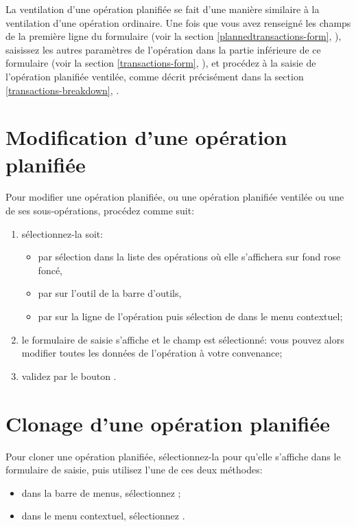 La ventilation d'une opération planifiée se fait d'une manière similaire à la ventilation d'une opération ordinaire. Une fois que vous avez renseigné les champs de la première ligne du formulaire (voir la section \vref{plannedtransactions-form}, ), saisissez les autres paramètres de l'opération dans la partie inférieure de ce formulaire (voir la section \vref{transactions-form}, ), et procédez à la saisie de l'opération planifiée ventilée, comme décrit précisément dans la section \vref{transactions-breakdown}, .


\section{Modification d'une opération planifiée\label{plannedtransactions-modify}}

Pour modifier une opération planifiée, ou une opération planifiée ventilée ou une de ses sous-opérations, procédez comme suit:

\begin{enumerate}
	\item sélectionnez-la soit:
		\begin{itemize}
			\item par sélection dans la liste des opérations où elle s'affichera sur \colorbox[RGB]{245,155,155}{fond rose foncé},
			\item par  sur l'outil  de la barre d'outils,
			\item par  sur la ligne de l'opération puis sélection de  dans le menu contextuel;
		\end{itemize}
	\item le formulaire de saisie s'affiche et le champ  est sélectionné: vous pouvez alors modifier toutes les données de l'opération à votre convenance;
	\item validez par le bouton .
\end{enumerate}


\section{Clonage d'une opération planifiée\label{plannedtransactions-duplicate}}

Pour cloner une opération planifiée, sélectionnez-la pour qu'elle s'affiche dans le formulaire de saisie, puis utilisez l'une de ces deux méthodes:
\begin{itemize}
	\item dans la barre de menus, sélectionnez ;
	\item dans le menu contextuel, sélectionnez .
\end{itemize}

